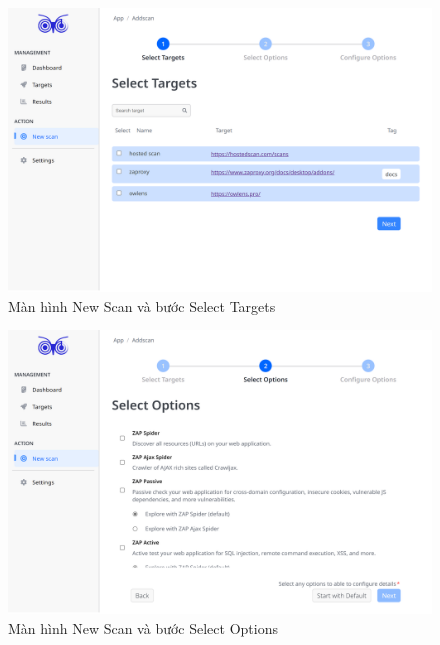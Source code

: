 \begin{figure}[H]
      \centering
      \includegraphics[width=\textwidth]{applied-thesis-chapters/chapter-6/Màn hình New Scan và bước Select Targets.png}
      \caption{Màn hình New Scan và bước Select Targets}
      \label{fig:ManHinhNewScanVaSelectTargets}
\end{figure}

\begin{figure}[H]
      \centering
      \includegraphics[width=\textwidth]{applied-thesis-chapters/chapter-6/Màn hình New Scan và bước Select Options.png}
      \caption{Màn hình New Scan và bước Select Options}
      \label{fig:ManHinhNewScanVaSelectOptions}
\end{figure}

